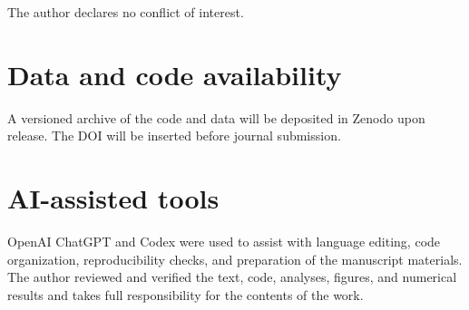 \documentclass[11pt]{article}
\begin{document}
The author declares no conflict of interest.

\section*{Data and code availability}

A versioned archive of the code and data will be deposited in Zenodo upon
release. The DOI will be inserted before journal submission.

\section*{AI-assisted tools}

OpenAI ChatGPT and Codex were used to assist with language editing, code
organization, reproducibility checks, and preparation of the manuscript
materials. The author reviewed and verified the text, code, analyses, figures,
and numerical results and takes full responsibility for the contents of the
work.
\end{document}
